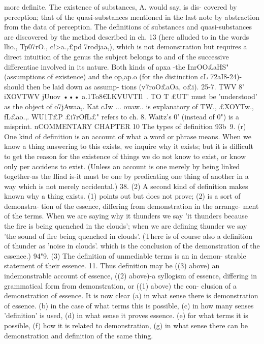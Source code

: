 {{{{{{{{{{{{{{{{{{{{{{{{{{{{{{{{{more definite. The existence of substances, A. would say, is dis-
covered by perception; that of the quasi-substances mentioned
in the last note by abstraction from the data of perception. The
definitions of substances and quasi-substances are discovered by
the method described in ch. 13 (here alluded to in the words llio.,
Tp07rO., c!>a.,£pd 7rodjaa,), which is not demonstration but requires
a direct intuition of the genus the subject belongs to and of the
successive differentiae involved in its nature. Both kinds of apxa{
-the InrOO£aHS" (assumptions of existence) and the op,ap.o{ (for
the distinction cL 72aI8-24)-should then be laid down as assump-
tions (v7roO£aOa, o£i).
25-7. TWV 8' iXOVTWV jUuov ••• a.1To8€LKVUVTIl~. TO T{ £UT' must
be 'understood' as the object of o7jAwaa,. Kat cJw ... ouaw.. is
explanatory of TW., £XOYTw., fL£ao.,. WU1T£P £i7rOfL£" refers to ch. 8.
Waitz's 0' (instead of 0") is a misprint.
nCOMMENTARY
CHAPTER 10
The types of definition
93b~9. (r) One kind of definition is an account of what a word
or phrase means. When we know a thing answering to this exists,
we inquire why it exists; but it is difficult to get the reason for the
existence of things we do not know to exist, or know only per
accidens to exist. (Unless an account is one merely by being
linked together-as the Iliad is-it must be one by predicating
one thing of another in a way which is not merely accidental.)
38. (2) A second kind of definition makes known why a thing
exists. (1) points out but does not prove; (2) is a sort of demonstra-
tion of the essence, differing from demonstration in the arrange-
ment of the terms. When we are saying why it thunders we say
'it thunders because the fire is being quenched in the clouds';
when we are defining thunder we say 'the sound of fire being
quenched in clouds'. (There is of course also a definition of thunder
as 'noise in clouds'. which is the conclusion of the demonstration
of the essence.)
94"9. (3) The definition of unmediable terms is an in demon-
strable statement of their essence.
11. Thus definition may be ((3) above) an indemonstrable
account of essence, ((2) above)-a syllogism of essence, differing
in grammatical form from demonstration, or ((1) above) the con-
clusion of a demonstration of essence. It is now clear (a) in what
sense there is demonstration of essence. (b) in the case of what
terms this is possible, (c) in how many senses 'definition' is used,
(d) in what sense it proves essence. (e) for what terms it is possible,
(f) how it is related to demonstration, (g) in what sense there can
be demonstration and definition of the same thing.
}}}}}}}}}}}}}}}}}}}}}}}}}}}}}}}}}}}}
